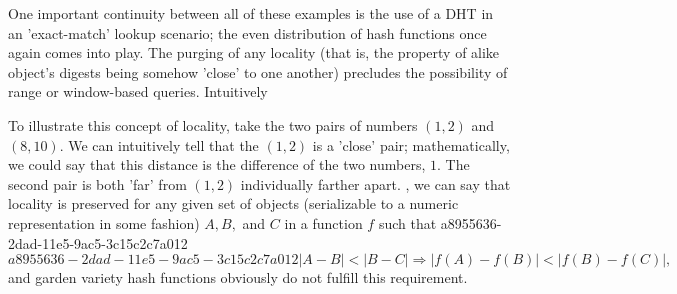 \documentclass[12pt]{article}
\begin{document}
\par One important continuity between all of these examples is the use of a DHT in an 'exact-match' lookup scenario; the even distribution of hash functions once again comes into play. The purging of any locality (that is, the property of alike object's digests being somehow 'close' to one another) precludes the possibility of range or window-based queries. Intuitively

\par To illustrate this concept of locality, take the two pairs of numbers $(1,2)$ and $(8,10)$. We can intuitively tell that the $(1,2)$ is a 'close' pair; mathematically, we could say that this distance is the difference of the two numbers, $1$. The second pair is both 'far' from $(1,2)$ individually farther apart. , we can say that locality is preserved for any given set of objects (serializable to a numeric representation in some fashion) $A,B,$ and $C$ in a function $f$ such that
a8955636-2dad-11e5-9ac5-3c15c2c7a012\begin{equation}
a8955636-2dad-11e5-9ac5-3c15c2c7a012|A-B| < |B-C| \Rightarrow |f(A)-f(B)| < |f(B) - f(C)|,
\end{equation}
and garden variety hash functions obviously do not fulfill this requirement.

\printbibliography
\end{document}
